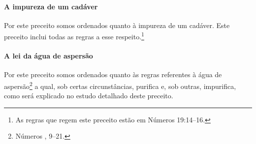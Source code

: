 \begin{multicols}{2}
\paragraph{A impureza de um cadáver}

Por este preceito somos ordenados quanto à impureza de um cadáver. Este
preceito inclui todas as regras a esse respeito.\footnote{As regras que regem este preceito estão em Números 19:14--16.}

\paragraph{A lei da água de aspersão}

Por este preceito somos ordenados quanto às regras referentes à água
de aspersão\footnote{Números , 9--21.} a qual, sob certas circunstâncias,
purifica e, sob outras, impurifica, como será explicado no estudo
detalhado deste preceito.


\end{multicols}
